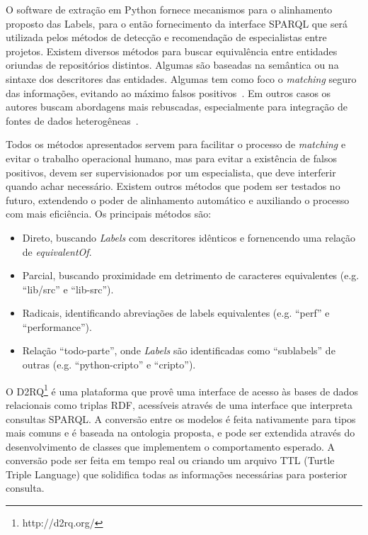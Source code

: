 \documentclass[peerreview]{acmart}
\begin{document}
O software de extração em Python fornece mecanismos para o alinhamento proposto das Labels, para o então fornecimento da interface SPARQL que será utilizada pelos métodos de detecção e recomendação de especialistas entre projetos. Existem diversos métodos para buscar equivalência entre entidades oriundas de repositórios distintos. Algumas são baseadas na semântica ou na sintaxe dos descritores das entidades. Algumas tem como foco o \textit{matching} seguro das informações, evitando ao máximo falsos positivos~\cite{vasilescu2013}. Em outros casos os autores buscam abordagens mais rebuscadas, especialmente para integração de fontes de dados heterogêneas~\cite{silvestri2015}.

Todos os métodos apresentados servem para facilitar o processo de \textit{matching} e evitar o trabalho operacional humano, mas para evitar a existência de falsos positivos, devem ser supervisionados por um especialista, que deve interferir quando achar necessário. Existem outros métodos que podem ser testados no futuro, extendendo o poder de alinhamento automático e auxiliando o processo com mais eficiência. Os principais métodos são:

\begin{itemize}
  \item Direto, buscando \textit{Labels} com descritores idênticos e fornencendo uma relação de \textit{equivalentOf}.
  \item Parcial, buscando proximidade em detrimento de caracteres equivalentes (e.g. ``lib/src'' e ``lib-src'').
  \item Radicais, identificando abreviações de labels equivalentes (e.g. ``perf'' e ``performance'').
  \item Relação ``todo-parte'', onde \textit{Labels} são identificadas como ``sublabels'' de outras (e.g. ``python-cripto'' e ``cripto'').
\end{itemize}

O D2RQ\footnote{http://d2rq.org/} é uma plataforma que provê uma interface de acesso às bases de dados relacionais como triplas RDF, acessíveis através de uma interface que interpreta consultas SPARQL. A conversão entre os modelos é feita nativamente para tipos mais comuns e é baseada na ontologia proposta, e pode ser extendida através do desenvolvimento de classes que implementem o comportamento esperado. A conversão pode ser feita em tempo real ou criando um arquivo TTL (Turtle Triple Language) que solidifica todas as informações necessárias para posterior consulta.
\end{document}
